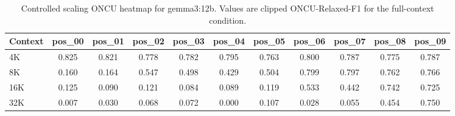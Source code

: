 \begin{table}[!t]
\renewcommand{\arraystretch}{1.08}
\caption{Controlled scaling ONCU heatmap for gemma3:12b. Values are clipped ONCU-Relaxed-F1 for the full-context condition.}
\label{tab:controlled_scaling_heatmap}
\centering
\scriptsize
\setlength{\tabcolsep}{3pt}
\begin{tabular}{lcccccccccc}
\toprule
Context & pos_00 & pos_01 & pos_02 & pos_03 & pos_04 & pos_05 & pos_06 & pos_07 & pos_08 & pos_09 \\
\midrule
4K & 0.825 & 0.821 & 0.778 & 0.782 & 0.795 & 0.763 & 0.800 & 0.787 & 0.775 & 0.787 \\
8K & 0.160 & 0.164 & 0.547 & 0.498 & 0.429 & 0.504 & 0.799 & 0.797 & 0.762 & 0.766 \\
16K & 0.125 & 0.090 & 0.121 & 0.084 & 0.089 & 0.119 & 0.533 & 0.442 & 0.742 & 0.725 \\
32K & 0.007 & 0.030 & 0.068 & 0.072 & 0.000 & 0.107 & 0.028 & 0.055 & 0.454 & 0.750 \\
\bottomrule
\end{tabular}
\end{table}
